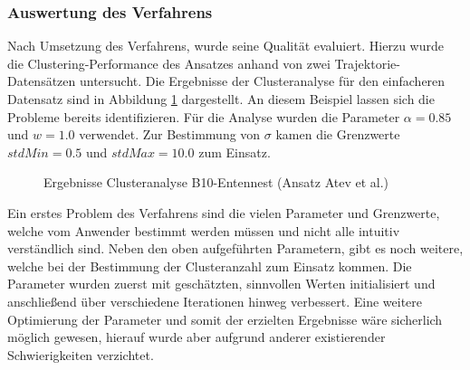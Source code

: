 \subsubsection{Auswertung des Verfahrens}

Nach Umsetzung des Verfahrens, wurde seine Qualität evaluiert. Hierzu wurde die Clustering-Performance des Ansatzes
anhand von zwei Trajektorie-Datensätzen untersucht.
Die Ergebnisse der Clusteranalyse für den einfacheren Datensatz sind in Abbildung \ref{fig:real_results_atev1}
dargestellt. An diesem Beispiel lassen sich die Probleme bereits identifizieren.
Für die Analyse wurden die Parameter $\alpha = 0.85$ und $w = 1.0$ verwendet.
Zur Bestimmung von $\sigma$ kamen die Grenzwerte $stdMin = 0.5$ und $stdMax = 10.0$ zum Einsatz.

\begin{figure}
    \centering
    \qquad \qquad
    \caption{Ergebnisse Clusteranalyse B10-Entennest (Ansatz Atev et al.)}
    \label{fig:real_results_atev1}
\end{figure}

Ein erstes Problem des Verfahrens sind die vielen Parameter und Grenzwerte, welche vom Anwender bestimmt werden müssen und
nicht alle intuitiv verständlich sind.
Neben den oben aufgeführten Parametern, gibt es
noch weitere, welche bei der Bestimmung der Clusteranzahl zum Einsatz kommen. Die Parameter wurden
zuerst mit geschätzten, sinnvollen Werten initialisiert und anschließend über verschiedene Iterationen hinweg verbessert.
Eine weitere Optimierung der Parameter und somit der erzielten Ergebnisse wäre sicherlich möglich gewesen,
hierauf wurde aber aufgrund anderer existierender Schwierigkeiten verzichtet.

